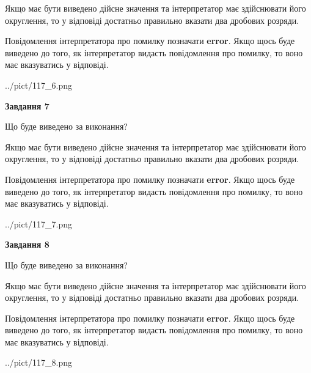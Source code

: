 \documentclass[12pt, ukrainian]{article}
\begin{document}
{\begin {Large}
Якщо має бути виведено дійсне значення та інтерпретатор має здійснювати його округлення, 
то у відповіді достатньо правильно вказати два дробових розряди.

Повідомлення інтерпретатора про помилку позначати \textbf{error}.
Якщо щось буде виведено до того, як інтерпретатор видасть повідомлення про помилку, 
то воно має вказуватись у відповіді. \par

\begin{center}
	{../pict/117_6.png}
\end{center}
\newpage

{\begin {center}\textbf{Завдання 7}\end {center}}\par
Що буде виведено за виконання? \par

Якщо має бути виведено дійсне значення та інтерпретатор має здійснювати його округлення, 
то у відповіді достатньо правильно вказати два дробових розряди.

Повідомлення інтерпретатора про помилку позначати \textbf{error}.
Якщо щось буде виведено до того, як інтерпретатор видасть повідомлення про помилку, 
то воно має вказуватись у відповіді. \par

\begin{center}
	{../pict/117_7.png}
\end{center}
\newpage

{\begin {center}\textbf{Завдання 8}\end {center}}\par
Що буде виведено за виконання? \par

Якщо має бути виведено дійсне значення та інтерпретатор має здійснювати його округлення, 
то у відповіді достатньо правильно вказати два дробових розряди.

Повідомлення інтерпретатора про помилку позначати \textbf{error}.
Якщо щось буде виведено до того, як інтерпретатор видасть повідомлення про помилку, 
то воно має вказуватись у відповіді. \par

\begin{center}
	{../pict/117_8.png}
\end{center}
\newpage


\end{Large}}
\end{document}
